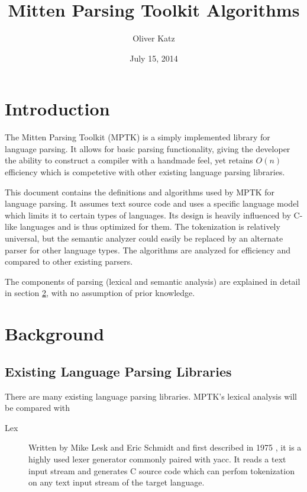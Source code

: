 \documentclass[10pt,a4paper]{article}
\title{Mitten Parsing Toolkit Algorithms}
\author{Oliver Katz}
\date{July 15, 2014}
\begin{document}
\maketitle

\tableofcontents

\section{Introduction}

The Mitten Parsing Toolkit (MPTK) is a simply implemented library for language parsing. It allows for basic parsing functionality, giving the developer the ability to construct a compiler with a handmade feel, yet retains $O(n)$ efficiency which is competetive with other existing language parsing libraries.

This document contains the definitions and algorithms used by MPTK for language parsing. It assumes text source code and uses a specific language model which limits it to certain types of languages. Its design is heavily influenced by C-like languages and is thus optimized for them. The tokenization is relatively universal, but the semantic analyzer could easily be replaced by an alternate parser for other language types. The algorithms are analyzed for efficiency and compared to other existing parsers.

The components of parsing (lexical and semantic analysis) are explained in detail in section \ref{sec:Background}, with no assumption of prior knowledge.

\section{Background}
\label{sec:Background}

\subsection{Existing Language Parsing Libraries}
There are many existing language parsing libraries. MPTK's lexical analysis will be compared with
\begin{description}
\item[Lex] Written by Mike Lesk and Eric Schmidt and first described in 1975 \cite{LEX_Book}, it is a highly used lexer generator commonly paired with yacc. It reads a text input stream and generates C source code which can perfom tokenization on any text input stream of the target language.
\end{description}
\end{document}
